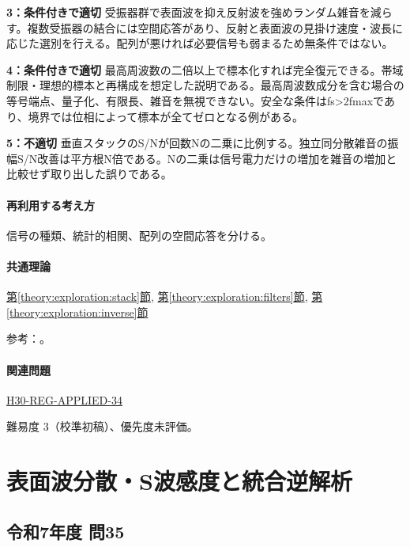 \noindent\textbf{3：条件付きで適切} 受振器群で表面波を抑え反射波を強めランダム雑音を減らす。複数受振器の結合には空間応答があり、反射と表面波の見掛け速度・波長に応じた選別を行える。配列が悪ければ必要信号も弱まるため無条件ではない。\par

\noindent\textbf{4：条件付きで適切} 最高周波数の二倍以上で標本化すれば完全復元できる。帯域制限・理想的標本と再構成を想定した説明である。最高周波数成分を含む場合の等号端点、量子化、有限長、雑音を無視できない。安全な条件はfs>2fmaxであり、境界では位相によって標本が全てゼロとなる例がある。\par

\noindent\textbf{5：不適切} 垂直スタックのS/Nが回数Nの二乗に比例する。独立同分散雑音の振幅S/N改善は平方根N倍である。Nの二乗は信号電力だけの増加を雑音の増加と比較せず取り出した誤りである。\par

\paragraph{再利用する考え方} 信号の種類、統計的相関、配列の空間応答を分ける。

\paragraph{共通理論} \hyperref[theory:exploration:stack]{第\ref*{theory:exploration:stack}節}, \hyperref[theory:exploration:filters]{第\ref*{theory:exploration:filters}節}, \hyperref[theory:exploration:inverse]{第\ref*{theory:exploration:inverse}節}

\par 参考：\cite{mit_signals2010,mit_moving2012,scipy_notch,scipy_fft,usgs_processing2000,pygimli_inversion}。

\paragraph{関連問題} \hyperref[q:h30-reg-applied-34]{H30-REG-APPLIED-34}

\par 難易度 3（校準初稿）、優先度未評価。

\section{表面波分散・S波感度と統合逆解析}

\subsection{令和7年度 問35}
\label{q:r07-reg-applied-35}

